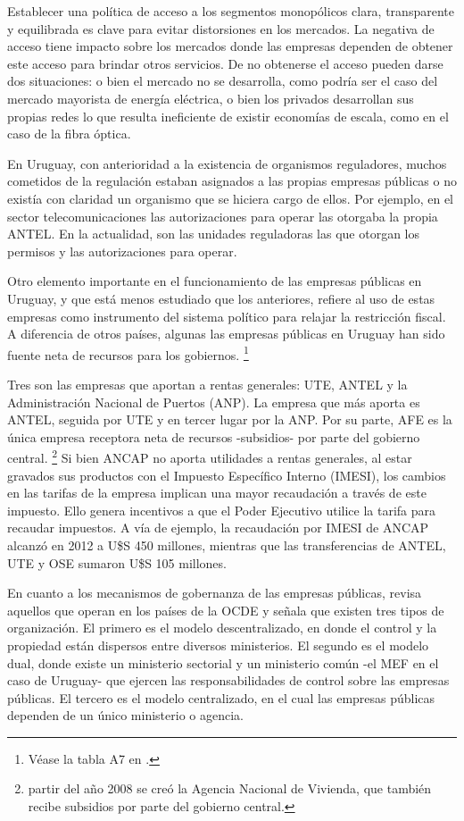 \documentclass[
  12pt,
  spanish,
]{book}
\begin{document}
Establecer una política de acceso a los segmentos monopólicos clara, transparente y equilibrada es clave para evitar distorsiones en los mercados. La negativa de acceso tiene impacto sobre los mercados donde las empresas dependen de obtener este acceso para brindar otros servicios. De no obtenerse el acceso pueden darse dos situaciones: o bien el mercado no se desarrolla, como podría ser el caso del mercado mayorista de energía eléctrica, o bien los privados desarrollan sus propias redes lo que resulta ineficiente de existir economías de escala, como en el caso de la fibra óptica.

En Uruguay, con anterioridad a la existencia de organismos reguladores, muchos cometidos de la regulación estaban asignados a las propias empresas públicas o no existía con claridad un organismo que se hiciera cargo de ellos. Por ejemplo, en el sector telecomunicaciones las autorizaciones para operar las otorgaba la propia ANTEL. En la actualidad, son las unidades reguladoras las que otorgan los permisos y las autorizaciones para operar.

Otro elemento importante en el funcionamiento de las empresas públicas en Uruguay, y que está menos estudiado que los anteriores, refiere al uso de estas empresas como instrumento del sistema político para relajar la restricción fiscal. A diferencia de otros países, algunas las empresas públicas en Uruguay han sido fuente neta de recursos para los gobiernos.
\footnote{Véase la tabla A7 en \citet{WorldBank1995}.}

Tres son las empresas que aportan a rentas generales: UTE, ANTEL y la Administración Nacional de Puertos (ANP). La empresa que más aporta es ANTEL, seguida por UTE y en tercer lugar por la ANP. Por su parte, AFE es la única empresa receptora neta de recursos -subsidios- por parte del gobierno central.
\footnote{partir del año 2008 se creó la Agencia Nacional de Vivienda, que también recibe
  subsidios por parte del gobierno central.}
Si bien ANCAP no aporta utilidades a rentas generales, al estar gravados sus productos con el Impuesto Específico Interno (IMESI), los cambios en las tarifas de la empresa implican una mayor recaudación a través de este impuesto. Ello genera incentivos a que el Poder Ejecutivo utilice la tarifa para recaudar impuestos. A vía de ejemplo, la recaudación por IMESI de ANCAP alcanzó en 2012 a U\$S 450 millones, mientras que las transferencias de ANTEL, UTE y OSE sumaron U\$S 105 millones.

En cuanto a los mecanismos de gobernanza de las empresas públicas, \citet{Vagliasindi2008} revisa aquellos que operan en los países de la OCDE y señala que existen tres tipos de organización. El primero es el modelo descentralizado, en donde el control y la propiedad están dispersos entre diversos ministerios. El segundo es el modelo dual, donde existe un ministerio sectorial y un ministerio común -el MEF en el caso de Uruguay- que ejercen las responsabilidades de control sobre las empresas públicas. El tercero es el modelo centralizado, en el cual las empresas públicas dependen de un único ministerio o agencia.
\end{document}
